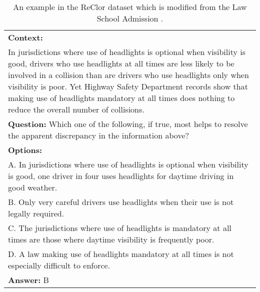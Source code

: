 \documentclass{article} \usepackage{iclr2020_conference,times}
\begin{document}
	
\vspace{-4mm}
\begin{table}
	\small
	\centering
	\caption{An example in the ReClor dataset which is modified from the Law School Admission \citet{lsac19logical-b}.}
	\begin{tabular}{|p{}|}
		\hline 
		{\bf Context:} \\
		In jurisdictions where use of headlights is optional when visibility is good, drivers who use headlights at all times are less likely to be involved in a collision than are drivers who use headlights only when visibility is poor. Yet Highway Safety Department records show that making use of headlights mandatory at all times does nothing to reduce the overall number of collisions.\\
		{\bf Question:}
		Which one of the following, if true, most helps to resolve the apparent discrepancy in the information above?\\
		{\bf Options:}\\
			A. In jurisdictions where use of headlights is optional when visibility is good, one driver in four uses headlights for daytime driving in good weather.\\
			B. Only very careful drivers use headlights when their use is not legally required.\\
			C. The jurisdictions where use of headlights is mandatory at all times are those where daytime visibility is frequently poor.\\
			D. A law making use of headlights mandatory at all times is not especially difficult to enforce.\\
		{\bf Answer:} B \\
		\hline		
	\end{tabular}
	\label{tab:example}
\end{table}
\vspace{-2mm}
\end{document}
